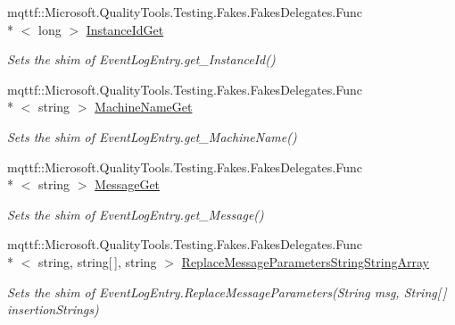 \begin{DoxyCompactItemize}
mqttf\-::\-Microsoft.\-Quality\-Tools.\-Testing.\-Fakes.\-Fakes\-Delegates.\-Func\\*
$<$ long $>$ \hyperlink{class_system_1_1_diagnostics_1_1_fakes_1_1_shim_event_log_entry_aede3af464acbd4bc9af1b70866e37ce2}{Instance\-Id\-Get}
\begin{DoxyCompactList}\small\item\em Sets the shim of Event\-Log\-Entry.\-get\-\_\-\-Instance\-Id()\end{DoxyCompactList}\item 
mqttf\-::\-Microsoft.\-Quality\-Tools.\-Testing.\-Fakes.\-Fakes\-Delegates.\-Func\\*
$<$ string $>$ \hyperlink{class_system_1_1_diagnostics_1_1_fakes_1_1_shim_event_log_entry_a31ffcaa77bc80629cccde86faf0b6fd3}{Machine\-Name\-Get}
\begin{DoxyCompactList}\small\item\em Sets the shim of Event\-Log\-Entry.\-get\-\_\-\-Machine\-Name()\end{DoxyCompactList}\item 
mqttf\-::\-Microsoft.\-Quality\-Tools.\-Testing.\-Fakes.\-Fakes\-Delegates.\-Func\\*
$<$ string $>$ \hyperlink{class_system_1_1_diagnostics_1_1_fakes_1_1_shim_event_log_entry_a0ace60918d50469046a33d93d870e276}{Message\-Get}
\begin{DoxyCompactList}\small\item\em Sets the shim of Event\-Log\-Entry.\-get\-\_\-\-Message()\end{DoxyCompactList}\item 
mqttf\-::\-Microsoft.\-Quality\-Tools.\-Testing.\-Fakes.\-Fakes\-Delegates.\-Func\\*
$<$ string, string\mbox{[}$\,$\mbox{]}, string $>$ \hyperlink{class_system_1_1_diagnostics_1_1_fakes_1_1_shim_event_log_entry_a9256c7e2f24f8125e2093392ff138c6b}{Replace\-Message\-Parameters\-String\-String\-Array}
\begin{DoxyCompactList}\small\item\em Sets the shim of Event\-Log\-Entry.\-Replace\-Message\-Parameters(\-String msg, String\mbox{[}$\,$\mbox{]} insertion\-Strings)\end{DoxyCompactList}\item 

\end{DoxyCompactItemize}
